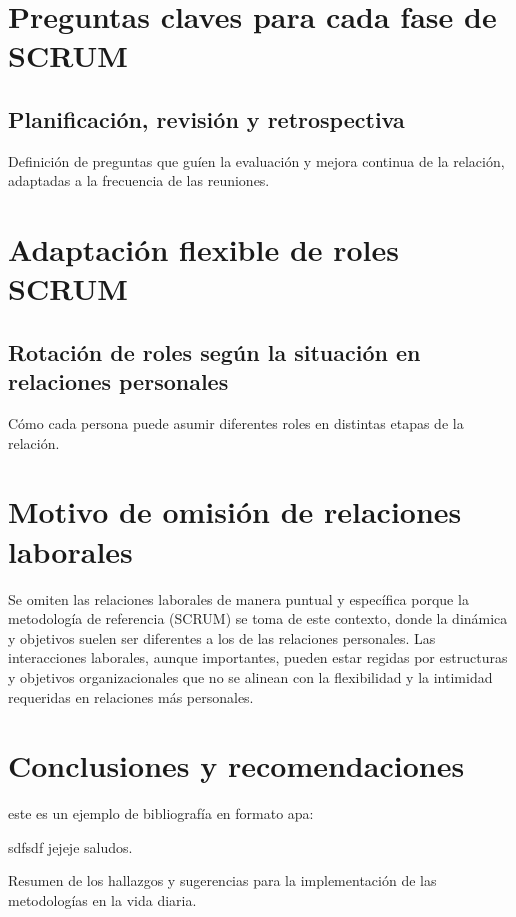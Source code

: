 \documentclass[letterpaper,12pt]{article} %
\begin{document}
	\section{Preguntas claves para cada fase de SCRUM}
	\subsection{Planificación, revisión y retrospectiva}
	Definición de preguntas que guíen la evaluación y mejora continua de la relación, adaptadas a la frecuencia de las reuniones.
	
	\section{Adaptación flexible de roles SCRUM}
	\subsection{Rotación de roles según la situación en relaciones personales}
	Cómo cada persona puede asumir diferentes roles en distintas etapas de la relación.
	
	\section{Motivo de omisión de relaciones laborales}
	Se omiten las relaciones laborales de manera puntual y específica porque la metodología de referencia (SCRUM) se toma de este contexto, donde la dinámica y objetivos suelen ser diferentes a los de las relaciones personales. Las interacciones laborales, aunque importantes, pueden estar regidas por estructuras y objetivos organizacionales que no se alinean con la flexibilidad y la intimidad requeridas en relaciones más personales.
	
	\section{Conclusiones y recomendaciones}
	
	este es un ejemplo de bibliografía en formato apa: \cite{test0} 
	
	sdfsdf
	\cite{test1}jejeje saludos.	
	
	
	Resumen de los hallazgos y sugerencias para la implementación de las metodologías en la vida diaria.
	
	
	
	
	
\end{document}
